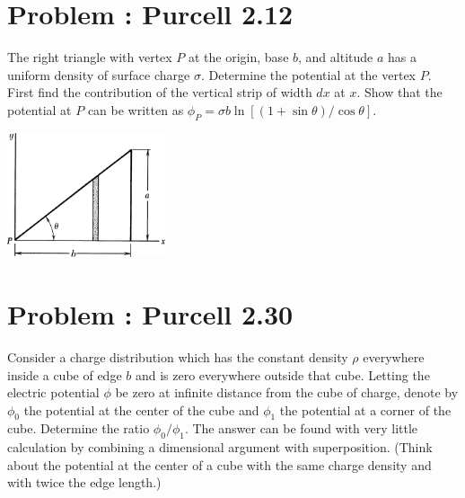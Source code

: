 \documentclass[problems]{esg8022pset}
\begin{document}
\section{Problem \thesection: Purcell 2.12}
  The right triangle with vertex $P$ at the origin, base $b$, and altitude $a$ has a uniform density of surface charge $\sigma$. Determine the potential at the vertex $P$. First find the contribution of the vertical strip of width $dx$ at $x$. Show that the potential at $P$ can be written as $\phi_P = \sigma b \ln[(1 + \sin \theta) / \cos \theta]$.
  \begin{center}\includegraphics[width=0.35\textwidth]{ps02_3}\end{center}
\section{Problem \thesection: Purcell 2.30}
  Consider a charge distribution which has the constant density $\rho$ everywhere inside a cube of edge $b$ and is zero everywhere outside that cube. Letting the electric potential $\phi$ be zero at infinite distance from the cube of charge, denote by $\phi_0$ the potential at the center of the cube and $\phi_1$ the potential at a corner of the cube. Determine the ratio $\phi_0/\phi_1$. The answer can be found with very little calculation by combining a dimensional argument with superposition. (Think about the potential at the center of a cube with the same charge density and with twice the edge length.)
\end{document}
